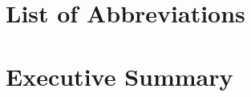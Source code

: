 \documentclass[draft,final]{thesisclass} %
\begin{document}
\frontmatter %

\addstatementpage
{} %


\begin{acknowledgements}
\lipsum[1]
\end{acknowledgements}

\listoffigures %
\cleardoublepage

\listoftables %
\cleardoublepage

\chapter{List of Abbreviations}
\begin{acronym}
\end{acronym}
\cleardoublepage


\tableofcontents %

\chapter{Executive Summary}
\lipsum[1]
\cleardoublepage

\begin{abstract}
\lipsum[1]
\end{abstract}

\mainmatter
\end{document}
